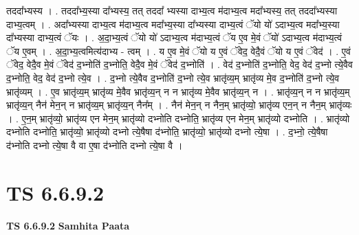 \documentclass[17pt]{extarticle}
\begin{document}
तददा᳚भ्यस्य । . तददा᳚भ्य॒स्या दा᳚भ्यस्य॒ तत् तददा᳚ भ्यस्या दाभ्य॒त्व म॑दाभ्य॒त्व मदा᳚भ्यस्य॒ तत् तददा᳚भ्यस्या दाभ्य॒त्वम् । . अदा᳚भ्यस्या दाभ्य॒त्व म॑दाभ्य॒त्व मदा᳚भ्य॒स्या दा᳚भ्यस्या दाभ्य॒त्वं ॅयो यो॑ ऽदाभ्य॒त्व मदा᳚भ्य॒स्या दा᳚भ्यस्या दाभ्य॒त्वं ॅयः । . अ॒दा॒भ्य॒त्वं ॅयो यो॑ ऽदाभ्य॒त्व म॑दाभ्य॒त्वं ॅय ए॒व मे॒वं ॅयो॑ ऽदाभ्य॒त्व म॑दाभ्य॒त्वं ॅय ए॒वम् । . अ॒दा॒भ्य॒त्वमित्य॑दाभ्य - त्वम् । . य ए॒व मे॒वं ॅयो य ए॒वं ॅवेद॒ वेदै॒वं ॅयो य ए॒वं ॅवेद॑ । . ए॒वं ॅवेद॒ वेदै॒व मे॒वं ॅवेद॑ द॒भ्नोति॑ द॒भ्नोति॒ वेदै॒व मे॒वं ॅवेद॑ द॒भ्नोति॑ । . वेद॑ द॒भ्नोति॑ द॒भ्नोति॒ वेद॒ वेद॑ द॒भ्नो त्ये॒वैव द॒भ्नोति॒ वेद॒ वेद॑ द॒भ्नो त्ये॒व । . द॒भ्नो त्ये॒वैव द॒भ्नोति॑ द॒भ्नो त्ये॒व भ्रातृ॑व्य॒म् भ्रातृ॑व्य मे॒व द॒भ्नोति॑ द॒भ्नो त्ये॒व भ्रातृ॑व्यम् । . ए॒व भ्रातृ॑व्य॒म् भ्रातृ॑व्य मे॒वैव भ्रातृ॑व्य॒न् न न भ्रातृ॑व्य मे॒वैव भ्रातृ॑व्य॒न् न । . भ्रातृ॑व्य॒न् न न भ्रातृ॑व्य॒म् भ्रातृ॑व्य॒न् नैन॑ मेन॒न् न भ्रातृ॑व्य॒म् भ्रातृ॑व्य॒न् नैन᳚म् । . नैन॑ मेन॒न् न नैन॒म् भ्रातृ॑व्यो॒ भ्रातृ॑व्य एन॒न् न नैन॒म् भ्रातृ॑व्यः । . ए॒न॒म् भ्रातृ॑व्यो॒ भ्रातृ॑व्य एन मेन॒म् भ्रातृ॑व्यो दभ्नोति दभ्नोति॒ भ्रातृ॑व्य एन मेन॒म् भ्रातृ॑व्यो दभ्नोति । . भ्रातृ॑व्यो दभ्नोति दभ्नोति॒ भ्रातृ॑व्यो॒ भ्रातृ॑व्यो दभ्नो त्ये॒षैषा द॑भ्नोति॒ भ्रातृ॑व्यो॒ भ्रातृ॑व्यो दभ्नो त्ये॒षा । . द॒भ्नो॒ त्ये॒षैषा द॑भ्नोति दभ्नो त्ये॒षा वै वा ए॒षा द॑भ्नोति दभ्नो त्ये॒षा वै । \newline
\pagebreak
{}

\section{ TS 6.6.9.2 }

\textbf{TS 6.6.9.2 } \newline
\textbf{Samhita Paata} \newline
\end{document}
